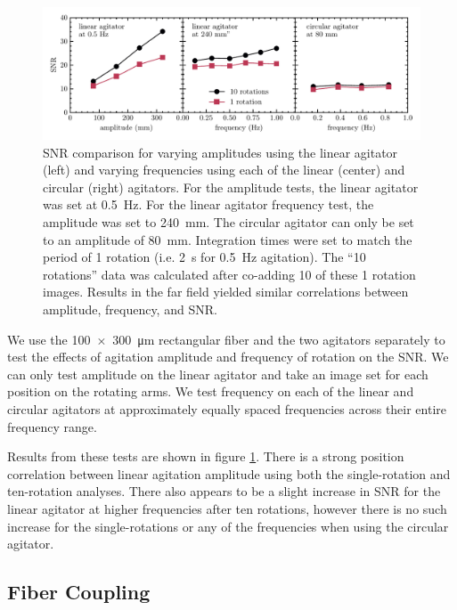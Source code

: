 \documentclass[twocolumn]{emulateapj}
\begin{document}
\begin{figure}[t]
\centering
	\includegraphics[width=\textwidth]{images/amp_freq_snr.pdf}
	\caption{SNR comparison for varying amplitudes using the linear agitator (left) and varying frequencies using each of the linear (center) and circular (right) agitators. For the amplitude tests, the linear agitator was set at \SI{0.5}{\hertz}. For the linear agitator frequency test, the amplitude was set to \SI{240}{\milli\meter}. The circular agitator can only be set to an amplitude of \SI{80}{\milli\meter}. Integration times were set to match the period of 1 rotation (i.e. \SI{2}{\second} for \SI{0.5}{\hertz} agitation). The ``10 rotations'' data was calculated after co-adding 10 of these 1 rotation images. Results in the far field yielded similar correlations between amplitude, frequency, and SNR.}
\label{fig:amp_freq_snr}
\end{figure}

We use the \SI{100x300}{\micro\meter} rectangular fiber and the two agitators separately to test the effects of agitation amplitude and frequency of rotation on the SNR. We can only test amplitude on the linear agitator and take an image set for each position on the rotating arms. We test frequency on each of the linear and circular agitators at approximately equally spaced frequencies across their entire frequency range.

Results from these tests are shown in figure \ref{fig:amp_freq_snr}. There is a strong position correlation between linear agitation amplitude using both the single-rotation and ten-rotation analyses. There also appears to be a slight increase in SNR for the linear agitator at higher frequencies after ten rotations, however there is no such increase for the single-rotations or any of the frequencies when using the circular agitator.



\subsection{Fiber Coupling}
\end{document}
